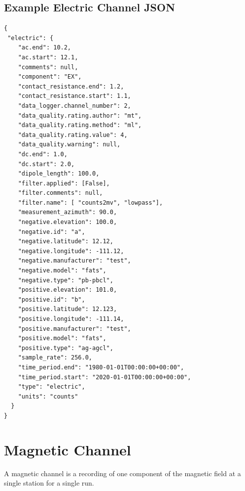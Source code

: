 \documentclass{article}
\begin{document}
\clearpage
\newpage
\subsection{Example Electric Channel JSON}

\begin{verbatim}
{
 "electric": {
    "ac.end": 10.2,
    "ac.start": 12.1,
    "comments": null,
    "component": "EX",
    "contact_resistance.end": 1.2,
    "contact_resistance.start": 1.1,
    "data_logger.channel_number": 2,
    "data_quality.rating.author": "mt",
    "data_quality.rating.method": "ml",
    "data_quality.rating.value": 4,
    "data_quality.warning": null,
    "dc.end": 1.0,
    "dc.start": 2.0,
    "dipole_length": 100.0,
    "filter.applied": [False],
    "filter.comments": null,
    "filter.name": [ "counts2mv", "lowpass"],
    "measurement_azimuth": 90.0,
    "negative.elevation": 100.0,
    "negative.id": "a",
    "negative.latitude": 12.12,
    "negative.longitude": -111.12,
    "negative.manufacturer": "test",
    "negative.model": "fats",
    "negative.type": "pb-pbcl",
    "positive.elevation": 101.0,
    "positive.id": "b",
    "positive.latitude": 12.123,
    "positive.longitude": -111.14,
    "positive.manufacturer": "test",
    "positive.model": "fats",
    "positive.type": "ag-agcl",
    "sample_rate": 256.0,
    "time_period.end": "1980-01-01T00:00:00+00:00",
    "time_period.start": "2020-01-01T00:00:00+00:00",
    "type": "electric",
    "units": "counts"
  }
}
\end{verbatim}

\clearpage
\newpage
\section{Magnetic Channel}

A magnetic channel is a recording of one component of the magnetic field at a single station for a single run.
\end{document}
